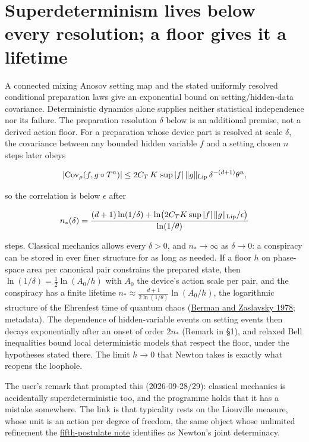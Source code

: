 \documentclass[11pt,a4paper]{article}
\begin{document}
\hypertarget{superdeterminism-lives-below-every-resolution-a-floor-gives-it-a-lifetime}{%
\section{Superdeterminism lives below every resolution; a floor gives it
a
lifetime}\label{superdeterminism-lives-below-every-resolution-a-floor-gives-it-a-lifetime}}

A connected mixing Anosov setting map and the stated uniformly resolved
conditional preparation laws give an exponential bound on
setting/hidden-data covariance. Deterministic dynamics alone supplies
neither statistical independence nor its failure. The preparation
resolution \(\delta\) below is an additional premise, not a derived
action floor. For a preparation whose device part is resolved at scale
\(\delta\), the covariance between any bounded hidden variable \(f\) and
a setting chosen \(n\) steps later obeys

\[|{\rm Cov}_\rho(f,g\circ T^n)|\le2C_T\,K\,\sup|f|\,\|g\|_{\rm Lip}\,\delta^{-(d+1)}\theta^n,\]

so the correlation is below \(\epsilon\) after

\[n_*(\delta)=\frac{(d+1)\ln(1/\delta)+\ln\bigl(2C_TK\sup|f|\,\|g\|_{\rm Lip}/\epsilon\bigr)}{\ln(1/\theta)}\]

steps. Classical mechanics allows every \(\delta>0\), and
\(n_*\to\infty\) as \(\delta\to0\): a conspiracy can be stored in ever
finer structure for as long as needed. If a floor \(h\) on phase-space
area per canonical pair constrains the prepared state, then
\(\ln(1/\delta)=\frac12\ln(A_0/h)\) with \(A_0\) the device's action
scale per pair, and the conspiracy has a finite lifetime
\(n_*\approx\frac{d+1}{2\ln(1/\theta)}\ln(A_0/h)\), the logarithmic
structure of the Ehrenfest time of quantum chaos
(\href{https://doi.org/10.1016/0378-4371(78)90190-5}{Berman and
Zaslavsky 1978}; metadata). The dependence of hidden-variable events on
setting events then decays exponentially after an onset of order
\(2n_*\) (Remark in §1), and relaxed Bell inequalities bound local
deterministic models that respect the floor, under the hypotheses stated
there. The limit \(h\to0\) that Newton takes is exactly what reopens the
loophole.

The user's remark that prompted this (2026-09-28/29): classical
mechanics is accidentally superdeterministic too, and the programme
holds that it has a mistake somewhere. The link is that typicality rests
on the Liouville measure, whose unit is an action per degree of freedom,
the same object whose unlimited refinement the
\href{principia-fifth-postulate.md}{fifth-postulate note} identifies as
Newton's joint determinacy.
\end{document}
